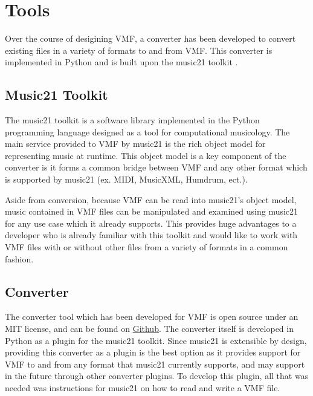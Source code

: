 
\section{Tools}

Over the course of desigining VMF, a converter has been developed to convert existing files in a variety of formats to and from VMF. This converter is implemented in Python and is built upon the music21 toolkit \citep*{CuAr10}.

\subsection{Music21 Toolkit}

The music21 toolkit is a software library implemented in the Python programming language designed as a tool for computational musicology. The main service provided to VMF by music21 is the rich object model \citep*{ArCu11} for representing music at runtime. This object model is a key component of the converter is it forms a common bridge between VMF and any other format which is supported by music21 (ex. MIDI, MusicXML, Humdrum, ect.).

Aside from conversion, because VMF can be read into music21's object model, music contained in VMF files can be manipulated and examined using music21 for any use case which it already supports. This provides huge advantages to a developer who is already familiar with this toolkit and would like to work with VMF files with or without other files from a variety of formats in a common fashion.

\subsection{Converter}

The converter tool which has been developed for VMF is open source under an MIT license, and can be found on \href{https://github.com/project-schumann/vmf-converter}{Github}. The converter itself is developed in Python as a plugin for the music21 toolkit. Since music21 is extensible by design, providing this converter as a plugin is the best option as it provides support for VMF to and from any format that music21 currently supports, and may support in the future through other converter plugins. To develop this plugin, all that was needed was instructions for music21 on how to read and write a VMF file.

